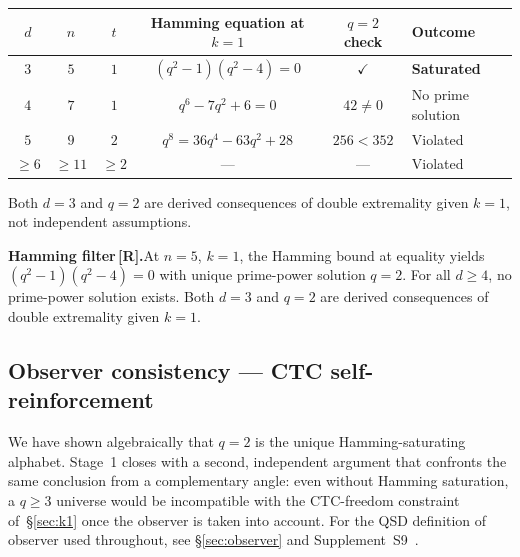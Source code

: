 \documentclass[11pt,a4paper]{article}
\newcommand{\Rmark}{\textcolor{green!50!black}{\textbf{[R]}}}
\begin{document}
\begin{center}
\renewcommand{\arraystretch}{1.25}
\begin{tabular}{cccccl}
\toprule
$d$ & $n$ & $t$ & Hamming equation at $k=1$ & $q=2$ check & Outcome \\
\midrule
$3$ & $5$ & $1$ & $(q^2-1)(q^2-4)=0$ & $\checkmark$ & \textbf{Saturated} \\
$4$ & $7$ & $1$ & $q^6-7q^2+6=0$ & $42\neq0$ & No prime solution \\
$5$ & $9$ & $2$ & $q^8 = 36q^4-63q^2+28$ & $256<352$ & Violated \\
$\geq 6$ & $\geq 11$ & $\geq 2$ & --- & --- & Violated \\
\bottomrule
\end{tabular}
\end{center}

Both $d=3$ and $q=2$ are derived consequences of double extremality given $k=1$, not independent assumptions.

\begin{mdframed}[backgroundcolor=Rbg,linecolor=Rcolor,linewidth=1.5pt]
\textbf{Hamming filter\,\Rmark.}\quad At $n=5$, $k=1$, the Hamming bound at equality yields $(q^2-1)(q^2-4)=0$ with unique prime-power solution $q=2$. For all $d\geq4$, no prime-power solution exists. Both $d=3$ and $q=2$ are derived consequences of double extremality given $k=1$.
\end{mdframed}

\subsection{Observer consistency --- CTC self-reinforcement}
\label{sec:obs_ctc}

We have shown algebraically that $q=2$ is the unique Hamming-saturating alphabet. Stage~1 closes with a second, independent argument that confronts the same conclusion from a complementary angle: even without Hamming saturation, a $q\geq3$ universe would be incompatible with the CTC-freedom constraint \cite{Deutsch1991} of~\S\ref{sec:k1} once the observer is taken into account. For the QSD definition of observer used throughout, see \S\ref{sec:observer} and Supplement~S9~\cite{Hubka2026QSDSupp}.
\end{document}
